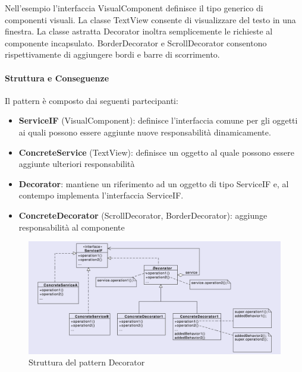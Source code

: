 Nell'esempio l'interfaccia VisualComponent definisce il tipo generico di componenti visuali. La classe TextView consente di visualizzare del testo in una finestra. La classe astratta Decorator inoltra semplicemente le richieste al componente incapsulato. BorderDecorator e ScrollDecorator consentono rispettivamente di aggiungere bordi e barre di scorrimento.

\paragraph{Struttura e Conseguenze} Il pattern è composto dai seguenti partecipanti:
\begin{itemize}
    \item \textbf{ServiceIF} (VisualComponent): definisce l'interfaccia comune per gli oggetti ai quali possono essere aggiunte nuove responsabilità dinamicamente.
    \item \textbf{ConcreteService} (TextView): definisce un oggetto al quale possono essere aggiunte ulteriori responsabilità
    \item \textbf{Decorator}: mantiene un riferimento ad un oggetto di tipo ServiceIF e, al contempo implementa l'interfaccia ServiceIF.
    \item \textbf{ConcreteDecorator} (ScrollDecorator, BorderDecorator): aggiunge responsabilità al componente
\end{itemize}


\begin{figure}[H]
    \centering
    \includegraphics[width=1\linewidth]{assets/pattern/decorator/decorator-struttura.png}
    \caption{Struttura del pattern Decorator}
\end{figure}

